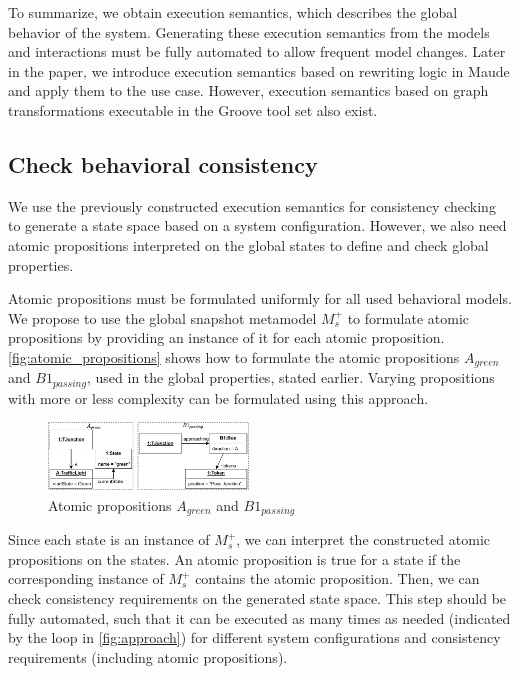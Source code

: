 \documentclass{jot}
\begin{document}
To summarize, we obtain execution semantics, which describes the global behavior of the system.
Generating these execution semantics from the models and interactions must be fully automated to allow frequent model changes.
Later in the paper, we introduce execution semantics based on rewriting logic in Maude and apply them to the use case.
However, execution semantics based on graph transformations executable in the Groove tool set also exist. 

\subsection{Check behavioral consistency}
We use the previously constructed execution semantics for consistency checking to generate a state space based on a system configuration.
However, we also need atomic propositions interpreted on the global states to define and check global properties.

Atomic propositions must be formulated uniformly for all used behavioral models.
We propose to use the global snapshot metamodel $M_s^+$ to formulate atomic propositions by providing an instance of it for each atomic proposition.
\autoref{fig:atomic_propositions} shows how to formulate the atomic propositions $A_{green}$ and $B1_{passing}$, used in the global properties, stated earlier.
Varying propositions with more or less complexity can be formulated using this approach.

\begin{figure}[h]
    \centering
    \includegraphics[width=0.475\textwidth]{figures/atomic_props.pdf}
    \caption{Atomic propositions $A_{green}$ and $B1_{passing}$}
    \label{fig:atomic_propositions}
\end{figure}

Since each state is an instance of $M_s^+$, we can interpret the constructed atomic propositions on the states.
An atomic proposition is true for a state if the corresponding instance of $M_s^+$ contains the atomic proposition.
Then, we can check consistency requirements on the generated state space.
This step should be fully automated, such that it can be executed as many times as needed (indicated by the loop in \autoref{fig:approach}) for different system configurations and consistency requirements (including atomic propositions).
\end{document}
